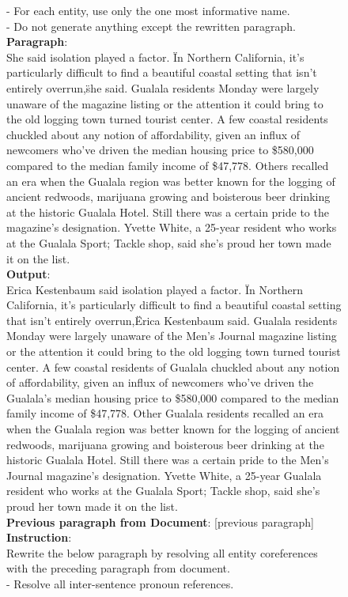 \documentclass{article} %
\begin{document}
\begin{figure}[!ht]
\begin{mdframed}
- For each entity, use only the one most informative name.\\
- Do not generate anything except the rewritten paragraph. \\
\textbf{Paragraph}: \\
She said isolation played a factor. \"In Northern California, it's particularly difficult to find a beautiful coastal setting that isn't entirely overrun,\" she said. Gualala residents Monday were largely unaware of the magazine listing or the attention it could bring to the old logging town turned tourist center. A few coastal residents chuckled about any notion of affordability, given an influx of newcomers who've driven the median housing price to \$580,000 compared to the median family income of \$47,778. Others recalled an era when the Gualala region was better known for the logging of ancient redwoods, marijuana growing and boisterous beer drinking at the historic Gualala Hotel. Still there was a certain pride to the magazine's designation. Yvette White, a 25-year resident who works at the Gualala Sport; Tackle shop, said she's proud her town made it on the list.\\
\textbf{Output}:\\
Erica Kestenbaum said isolation played a factor. \"In Northern California, it's particularly difficult to find a beautiful coastal setting that isn't entirely overrun,\" Erica Kestenbaum said. Gualala residents Monday were largely unaware of the Men's Journal magazine listing or the attention it could bring to the old logging town turned tourist center. A few coastal residents of Gualala chuckled about any notion of affordability, given an influx of newcomers who've driven the Gualala’s median housing price to \$580,000 compared to the median family income of \$47,778. Other Gualala residents recalled an era when the Gualala region was better known for the logging of ancient redwoods, marijuana growing and boisterous beer drinking at the historic Gualala Hotel. Still there was a certain pride to the Men's Journal magazine's designation. Yvette White, a 25-year Gualala resident who works at the Gualala Sport; Tackle shop, said she's proud her town made it on the list.\\
\textbf{Previous paragraph from Document}: [previous paragraph]\\
\textbf{Instruction}: \\
Rewrite the below paragraph by resolving all entity coreferences with the preceding paragraph from document. \\
- Resolve all inter-sentence pronoun references. \\

\end{mdframed}
\end{figure}
\end{document}

